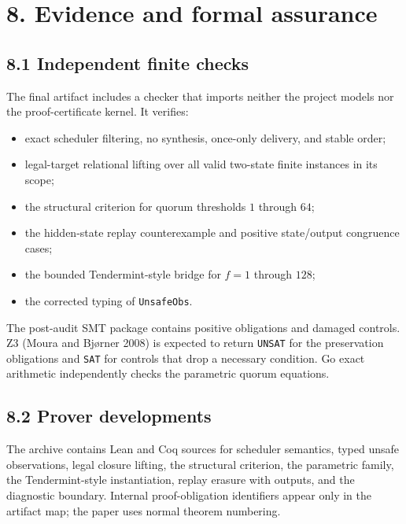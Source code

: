 \documentclass[10pt,a4paper]{article}
\newcommand{\tightlist}{\setlength{\itemsep}{0pt}\setlength{\parskip}{0pt}}
\begin{document}
\section{8. Evidence and formal
assurance}\label{evidence-and-formal-assurance}

\subsection{8.1 Independent finite
checks}\label{independent-finite-checks}

The final artifact includes a checker that imports neither the project
models nor the proof-certificate kernel. It verifies:

\begin{itemize}
\tightlist
\item
  exact scheduler filtering, no synthesis, once-only delivery, and
  stable order;
\item
  legal-target relational lifting over all valid two-state finite
  instances in its scope;
\item
  the structural criterion for quorum thresholds \(1\) through \(64\);
\item
  the hidden-state replay counterexample and positive state/output
  congruence cases;
\item
  the bounded Tendermint-style bridge for \(f=1\) through \(128\);
\item
  the corrected typing of \texttt{UnsafeObs}.
\end{itemize}

The post-audit SMT package contains positive obligations and damaged
controls. Z3 (Moura and Bjørner 2008) is expected to return
\texttt{UNSAT} for the preservation obligations and \texttt{SAT} for
controls that drop a necessary condition. Go exact arithmetic
independently checks the parametric quorum equations.

\subsection{8.2 Prover developments}\label{prover-developments}

The archive contains Lean and Coq sources for scheduler semantics, typed
unsafe observations, legal closure lifting, the structural criterion,
the parametric family, the Tendermint-style instantiation, replay
erasure with outputs, and the diagnostic boundary. Internal
proof-obligation identifiers appear only in the artifact map; the paper
uses normal theorem numbering.
\end{document}
